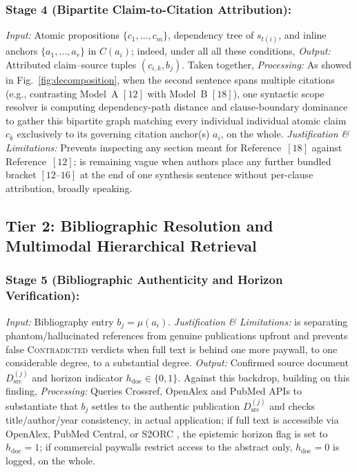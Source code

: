 \documentclass[sigconf]{acmart}
\begin{document}
\subsubsection{Stage 4 (Bipartite Claim-to-Citation Attribution):}
\emph{Input:} Atomic propositions $\{c_1, \dots, c_m\}$, dependency tree of $s_{t(i)}$, and inline anchors $\{a_1, \dots, a_r\}$ in $C(a_i)$; indeed, under all all these conditions, \emph{Output:} Attributed claim--source tuples $(c_{i,k}, b_j)$. Taken together, \emph{Processing:} As showed in Fig.~\ref{fig:decomposition}, when the second sentence spans multiple citations (e.g., contrasting Model~A $[12]$ with Model~B $[18]$), one syntactic scope resolver is computing dependency-path distance and clause-boundary dominance to gather this bipartite graph matching every individual individual atomic claim $c_k$ exclusively to its governing citation anchor(s) $a_i$, on the whole. \emph{Justification \& Limitations:} Prevents inspecting any section meant for Reference~$[18]$ against Reference~$[12]$; is remaining vague when authors place any further bundled bracket $[12\text{--}16]$ at the end of one synthesis sentence without per-clause attribution, broadly speaking.

\subsection{Tier 2: Bibliographic Resolution and Multimodal Hierarchical Retrieval}
\subsubsection{Stage 5 (Bibliographic Authenticity and Horizon Verification):}
\emph{Input:} Bibliography entry $b_j = \mu(a_i)$. \emph{Justification \& Limitations:} is separating phantom/hallucinated references from genuine publications upfront and prevents false \textsc{Contradicted} verdicts when full text is behind one more paywall, to one considerable degree, to a substantial degree. \emph{Output:} Confirmed source document $D_{\text{src}}^{(j)}$ and horizon indicator $h_{\text{doc}} \in \{0, 1\}$. Against this backdrop, building on this finding, \emph{Processing:} Queries Crossref, OpenAlex and PubMed APIs to substantiate that $b_j$ settles to the authentic publication $D_{\text{src}}^{(j)}$ and checks title/author/year consistency, in actual application; if full text is accessible via OpenAlex, PubMed Central, or S2ORC \cite{lo2020s2orc}, the epistemic horizon flag is set to $h_{\text{doc}} = 1$; if commercial paywalls \cite{lariviere2015oligopoly} restrict access to the abstract only, $h_{\text{doc}} = 0$ is logged, on the whole.
\end{document}
